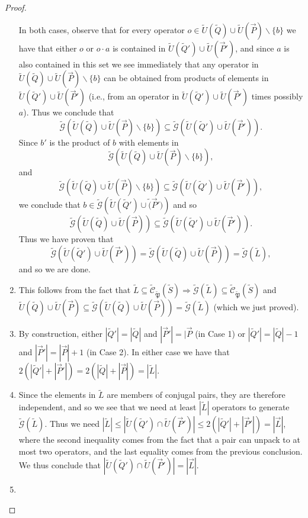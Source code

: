 \documentclass[12pt]{amsbook}
\theoremstyle{plain}
\theoremstyle{definition}
\theoremstyle{remark}
\newcommand{\lst}{\vec}
\newcommand{\set}{\tilde}
\newcommand{\genfun}{\tilde{\mathcal{G}}}
\newcommand{\pauligroup}{{\set{\mathfrak{P}}}}
\newcommand{\centralizer}{\set{\mathcal{C}}}
\newcommand{\paren}[1]{\left(#1\right)}
\begin{document}
\begin{proof}
\begin{enumerate}
In both cases, observe that for every operator $o\in\set U(\set Q)\cup\set U(\lst P)\backslash\{b\}$ we have that either $o$ or $o\cdot a$ is contained in $\set U(\set Q')\cup\set U(\lst P')$, and since $a$ is also contained in this set we see immediately that any operator in $\set U(\set Q)\cup\set U(\lst P)\backslash\{b\}$ can be obtained from products of elements in $\set U(\set Q')\cup\set U(\lst P')$ (i.e., from an operator in $\set U(\set Q')\cup\set U(\lst P')$ times possibly $a$).  Thus we conclude that $$\genfun\paren{\set U(\set Q)\cup\set U(\lst P)\backslash\{b\}}\subseteq\genfun\paren{\set U(\set Q')\cup\set U(\lst P')}.$$  Since $b'$ is the product of $b$ with elements in $$\genfun\paren{\set U(\set Q)\cup\set U(\lst P)\backslash\{b\}},$$ and $$\genfun\paren{\set U(\set Q)\cup\set U(\lst P)\backslash\{b\}}\subseteq\genfun\paren{\set U(\set Q')\cup\set U(\lst P')},$$ we conclude that $b\in\genfun\paren{\set U(\set Q')\cup\set(\lst P')}$ and so $$\genfun\paren{\set U(\set Q)\cup\set U(\lst P)}\subseteq\genfun\paren{\set U(\set Q')\cup\set U(\lst P')}.$$
Thus we have proven that $$\genfun\paren{\set U(\set Q')\cup\set U(\lst P')}=\genfun\paren{\set U(\set Q)\cup\set U(\lst P)}=\genfun(\set L),$$ and so we are done.
\item

This follows from the fact that $\set L\subseteq\centralizer_\pauligroup(\set S)\Rightarrow\genfun(\set L)\subseteq\centralizer_\pauligroup(\set S)$ and $\set U(\set Q)\cup\set U(\lst P)\subseteq\genfun\paren{\set U(\set Q)\cup\set U(\lst P)}=\genfun(\set L)$ (which we just proved).
\item

By construction, either $|\set Q'|=|\set Q|$ and $|\lst P'|=|\lst P$ (in Case 1) or $|\set Q'|=|\set Q|-1$ and $|\lst P'|=|\lst P|+1$ (in Case 2).  In either case we have that $2(|\set Q'|+|\lst P'|)=2(|\set Q|+|\lst P|)=|\set L|$.
\item

Since the elements in $\set L$ are members of conjugal pairs, they are therefore independent, and so we see that we need at least $|\set L|$ operators to generate $\genfun(\set L)$.  Thus we need $|\set L|\le|\set U(\set Q')\cap\set U(\lst P')|\le 2(|\set Q'|+|\lst P'|)=|\lst L|$,  where the second inequality comes from the fact that a pair can unpack to at most two operators, and the last equality comes from the previous conclusion.  We thus conclude that $|\set U(\set Q')\cap\set U(\lst P')|=|\lst L|$.
\item


\end{enumerate}
\end{proof}
\end{document}
